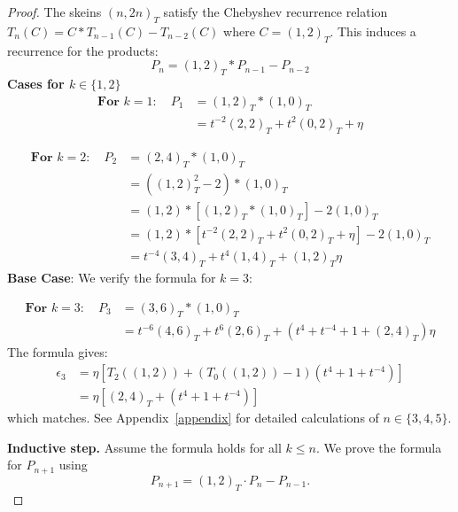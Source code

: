 \documentclass[12pt]{article}
\begin{document}
\begin{proof}
The skeins $(n,2n)_T$ satisfy the Chebyshev recurrence relation $T_n(C) = C \ast T_{n-1}(C) - T_{n-2}(C)$ where $C = (1,2)_T$. This induces a recurrence for the products:
\begin{equation}
P_n = (1,2)_T \ast P_{n-1} - P_{n-2}
\end{equation}
\textbf{Cases for $k \in \{1,2\}$}
\begin{align}
\textbf{For } k=1: \quad P_1 &= (1,2)_T \ast (1,0)_T \\
&= t^{-2}(2,2)_T + t^2(0,2)_T + \eta
\end{align}

\begin{align}
\textbf{For } k=2: \quad P_2 &= (2,4)_T \ast (1,0)_T \\
& = ((1,2)_T^2 - 2) \ast(1,0)_T \\
& = (1,2)\ast[(1,2)_T\ast(1,0)_T] - 2(1,0)_T \\
& = (1,2)\ast[t^{-2}(2,2)_T + t^2(0,2)_T + \eta] - 2(1,0)_T \\
&= t^{-4}(3,4)_T + t^4(1,4)_T + (1,2)_T\eta
\end{align}
\textbf{Base Case}:
\noindent We verify the formula for $k=3$:


\begin{align}
\textbf{For } k=3: \quad P_3 &= (3,6)_T \ast (1,0)_T \\
&= t^{-6}(4,6)_T + t^6(2,6)_T + (t^4 + t^{-4} + 1 + (2,4)_T)\eta
\end{align}
The formula gives:
\begin{align}
\epsilon_3 &= \eta \left[T_2((1,2)) + (T_0((1,2))-1)(t^4 + 1 + t^{-4})\right] \\
&= \eta \left[(2,4)_T + (t^4 + 1 + t^{-4})\right]
\end{align}
which matches. See Appendix~\ref{appendix} for detailed calculations of $n \in \{3,4,5\}$.




\noindent\textbf{Inductive step.}
Assume the formula holds for all $k\le n$. We prove the formula for $P_{n+1}$ using
\[
P_{n+1}=(1,2)_T\cdot P_n-P_{n-1}.
\]



\end{proof}
\end{document}
